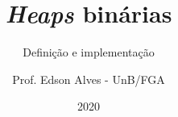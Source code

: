 \title{\textit{Heaps} binárias}
\subtitle{Definição e implementação}
\author{Prof. Edson Alves - UnB/FGA}
\date{2020}
